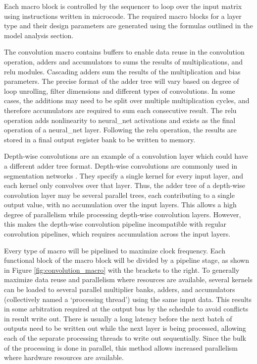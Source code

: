 \documentclass{uw-ece-wkrpt}
\begin{document}
Each macro block is controlled by the sequencer to loop over the input matrix using instructions written in microcode. The required macro blocks for a layer type and their design parameters are generated using the formulas outlined in the model analysis section.

The convolution macro contains buffers to enable data reuse in the convolution operation, adders and accumulators to sums the results of multiplications, and \gls{relu} modules. Cascading adders sum the results of the multiplication and \gls{bias} parameters. The precise format of the adder tree will vary based on degree of loop unrolling, \gls{filter} dimensions and different types of convolutions. In some cases, the additions may need to be split over multiple multiplication cycles, and therefore accumulators are required to sum each consecutive result. The \gls{relu} operation adds nonlinearity to \gls{neural_net} activations and exists as the final operation of a \gls{neural_net} layer. Following the \gls{relu} operation, the results are stored in a final output register bank to be written to memory.

Depth-wise convolutions are an example of a convolution layer which could have a different adder tree format. Depth-wise convolutions are commonly used in segmentation networks \cite{Howard2017MobileNets:-Eff}. They specify a single \gls{kernel} for every input layer, and each \gls{kernel} only convolves over that layer. Thus, the adder tree of a depth-wise convolution layer may be several parallel trees, each contributing to a single output value, with no accumulation over the input layers. This allows a high degree of parallelism while processing depth-wise convolution layers. However, this makes the depth-wise convolution pipeline incompatible with regular convolution pipelines, which requires accumulation across the input layers.

Every type of macro will be pipelined to maximize clock frequency. Each functional block of the macro block will be divided by a pipeline stage, as shown in Figure \ref{fig:convolution_macro} with the brackets to the right. To generally maximize data reuse and parallelism where resources are available, several \glspl{kernel} can be loaded to several parallel multiplier banks, adders, and accumulators (collectively named a `processing thread') using the same input data. This results in some arbitration required at the output bus by the schedule to avoid conflicts in result write out. There is usually a long latency before the next batch of outputs need to be written out while the next layer is being processed, allowing each of the separate processing threads to write out sequentially. Since the bulk of the processing is done in parallel, this method allows increased parallelism where hardware resources are available.
\end{document}
